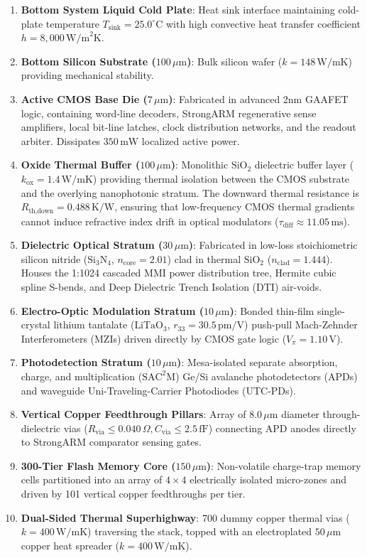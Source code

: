 \documentclass[journal]{IEEEtran}
\begin{document}
\begin{enumerate}
    \item \textbf{Bottom System Liquid Cold Plate}: Heat sink interface maintaining cold-plate temperature $T_{\text{sink}} = 25.0^\circ\text{C}$ with high convective heat transfer coefficient $h = 8,000\,\text{W/m}^2\text{K}$.
    \item \textbf{Bottom Silicon Substrate ($100\,\mu\text{m}$)}: Bulk silicon wafer ($k = 148\,\text{W/mK}$) providing mechanical stability.
    \item \textbf{Active CMOS Base Die ($7\,\mu\text{m}$)}: Fabricated in advanced 2nm GAAFET logic, containing word-line decoders, StrongARM regenerative sense amplifiers, local bit-line latches, clock distribution networks, and the readout arbiter. Dissipates $350\,\text{mW}$ localized active power.
    \item \textbf{Oxide Thermal Buffer ($100\,\mu\text{m}$)}: Monolithic $\text{SiO}_2$ dielectric buffer layer ($k_{\text{ox}} = 1.4\,\text{W/mK}$) providing thermal isolation between the CMOS substrate and the overlying nanophotonic stratum. The downward thermal resistance is $R_{\text{th,down}} = 0.488\,\text{K/W}$, ensuring that low-frequency CMOS thermal gradients cannot induce refractive index drift in optical modulators ($\tau_{\text{diff}} \approx 11.05\,\text{ms}$).
    \item \textbf{Dielectric Optical Stratum ($30\,\mu\text{m}$)}: Fabricated in low-loss stoichiometric silicon nitride ($\text{Si}_3\text{N}_4$, $n_{\text{core}} = 2.01$) clad in thermal $\text{SiO}_2$ ($n_{\text{clad}} = 1.444$). Houses the 1:1024 cascaded MMI power distribution tree, Hermite cubic spline S-bends, and Deep Dielectric Trench Isolation (DTI) air-voids.
    \item \textbf{Electro-Optic Modulation Stratum ($10\,\mu\text{m}$)}: Bonded thin-film single-crystal lithium tantalate ($\text{LiTaO}_3$, $r_{33} = 30.5\,\text{pm/V}$) push-pull Mach-Zehnder Interferometers (MZIs) driven directly by CMOS gate logic ($V_\pi = 1.10\,\text{V}$).
    \item \textbf{Photodetection Stratum ($10\,\mu\text{m}$)}: Mesa-isolated separate absorption, charge, and multiplication ($\text{SAC}^2\text{M}$) Ge/Si avalanche photodetectors (APDs) and waveguide Uni-Traveling-Carrier Photodiodes (UTC-PDs).
    \item \textbf{Vertical Copper Feedthrough Pillars}: Array of $8.0\,\mu\text{m}$ diameter through-dielectric vias ($R_{\text{via}} \le 0.040\,\Omega, C_{\text{via}} \le 2.5\,\text{fF}$) connecting APD anodes directly to StrongARM comparator sensing gates.
    \item \textbf{300-Tier Flash Memory Core ($150\,\mu\text{m}$)}: Non-volatile charge-trap memory cells partitioned into an array of $4 \times 4$ electrically isolated micro-zones and driven by 101 vertical copper feedthroughs per tier.
    \item \textbf{Dual-Sided Thermal Superhighway}: 700 dummy copper thermal vias ($k = 400\,\text{W/mK}$) traversing the stack, topped with an electroplated $50\,\mu\text{m}$ copper heat spreader ($k = 400\,\text{W/mK}$).
\end{enumerate}
\end{document}
